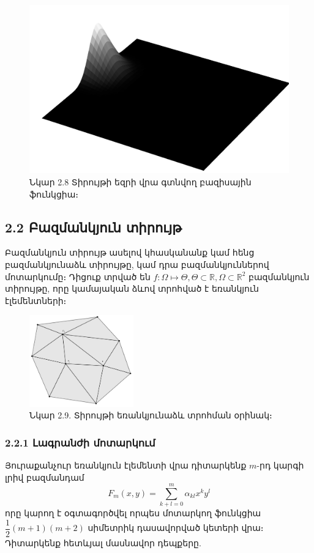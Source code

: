\documentclass[fleqn, bachelor,subf,12pt,notitlepage]{article}
\begin{document}
\begin{figure}[h!]
\centering
\includegraphics[width=1.0\textwidth]{images/two_dimensional_basis_1}
\captionsetup{labelformat=empty}
\caption{Նկար 2.8 Տիրույթի եզրի վրա գտնվող բազիսային ֆունկցիա։}
\end{figure}
\newpage
\subsection*{{2.2 Բազմանկյուն տիրույթ}}
Բազմանկյուն տիրույթ ասելով կհասկանանք կամ հենց բազմանկյունաձև տիրույթը, կամ դրա բազմանկյուններով մոտարկումը։
Դիցուք տրված են $f:\Omega\mapsto \Theta, \Theta \subset \mathbb{R}, \Omega \subset \mathbb{R}^{2} $ բազմանկյուն տիրույթը, որը կամայական ձևով տրոհված է եռանկյուն էլեմենտների։
\begin{figure}[H]
\centering
\includegraphics[width=0.4\textwidth]{images/two_var_triangular}
\captionsetup{labelformat=empty}
\caption{Նկար 2.9. Տիրույթի եռանկյունաձև տրոհման օրինակ։}
\end{figure}
\subsubsection*{{2.2.1 Լագրանժի մոտարկում}}
Յուրաքանչուր եռանկյուն էլեմենտի վրա դիտարկենք $m$-րդ կարգի լրիվ բազմանդամ
\begin{equation}
				F_{m}\left(x,y\right)=\sum_{k+l=0}^{m}\alpha_{kl}x^{k}y^{l}
\end{equation}
որը կարող է օգտագործվել որպես մոտարկող ֆունկցիա $\dfrac{1}{2}\left(m+1\right)\left(m+2\right)$ սիմետրիկ դասավորված կետերի վրա։
Դիտարկենք հետևյալ մասնավոր դեպքերը.
\end{document}
